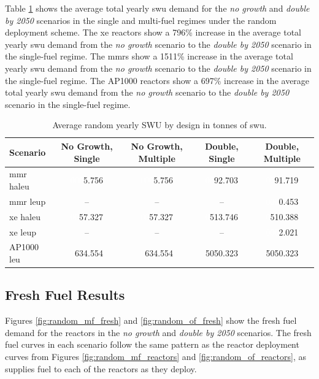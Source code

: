 Table \ref{tab:random_swu_avg} shows the average total yearly \gls{swu} demand for the \textit{no growth} and \textit{double by 2050} scenarios in the single and multi-fuel regimes under the random deployment scheme. The \gls{xe} reactors show a 796\% increase in the average total yearly \gls{swu} demand from the \textit{no growth} scenario to the \textit{double by 2050} scenario in the single-fuel regime. The \glspl{mmr} show a 1511\% increase in the average total yearly \gls{swu} demand from the \textit{no growth} scenario to the \textit{double by 2050} scenario in the single-fuel regime. The AP1000 reactors show a 697\% increase in the average total yearly \gls{swu} demand from the \textit{no growth} scenario to the \textit{double by 2050} scenario in the single-fuel regime.

\begin{table}[H]
    \centering
    \caption{Average random yearly SWU by design in tonnes of \gls{swu}.}
    \label{tab:random_swu_avg}
    \begin{tabular}{l c c c c}
       \hline
       Scenario & No Growth, Single & No Growth, Multiple & Double, Single & Double, Multiple  \\
       \hline
       \gls{mmr} \gls{haleu}   & \textcolor{white}{000}5.756   & \textcolor{white}{000}5.756   & \textcolor{white}{00}92.703    & \textcolor{white}{00}91.719   \\
       \gls{mmr} \gls{leup}    & --      & --      & --       & \textcolor{white}{000}0.453    \\
       \gls{xe} \gls{haleu}    & \textcolor{white}{00}57.327  & \textcolor{white}{00}57.327  & \textcolor{white}{0}513.746  & \textcolor{white}{0}510.388  \\
       \gls{xe} \gls{leup}     & --      & --      & --       & \textcolor{white}{000}2.021    \\
       AP1000 \gls{leu}        & \textcolor{white}{0}634.554 & \textcolor{white}{0}634.554 & 5050.323 & 5050.323 \\
       \hline
    \end{tabular}
\end{table}





\subsection{Fresh Fuel Results}
\label{sec:random_fresh}

Figures \ref{fig:random_mf_fresh} and \ref{fig:random_of_fresh} show the fresh fuel demand for the reactors in the \textit{no growth} and \textit{double by 2050} scenarios. The fresh fuel curves in each scenario follow the same pattern as the reactor deployment curves from Figures \ref{fig:random_mf_reactors} and \ref{fig:random_of_reactors}, as \cyclus supplies fuel to each of the reactors as they deploy.

